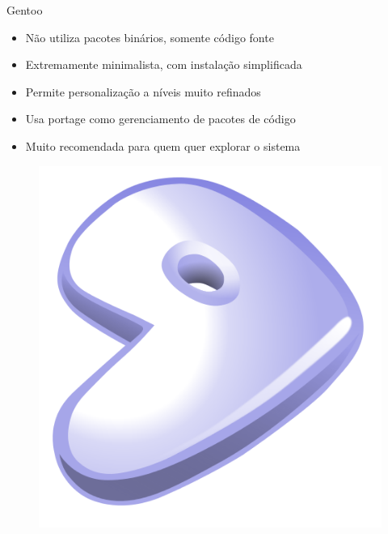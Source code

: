 \documentclass{beamer}
\begin{document}
\begin{frame}{Gentoo}
  \begin{itemize}
    \item{Não utiliza pacotes binários, somente código fonte}
    \item{Extremamente minimalista, com instalação simplificada}
    \item{Permite personalização a níveis muito refinados}
    \item{Usa portage como gerenciamento de pacotes de código}
    \item{Muito recomendada para quem quer explorar o sistema}
  \end{itemize}
      \begin{figure}[h!]
        \centering
        \includegraphics[scale=0.10]{gentoo.png}
    \end{figure}
\end{frame}
\end{document}
